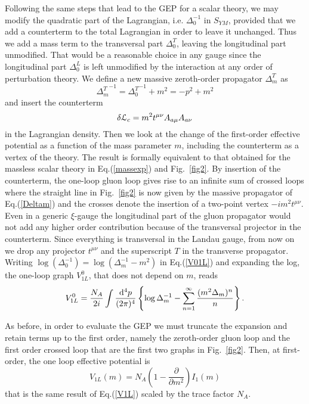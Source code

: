 \documentclass[aps,preprint]{revtex4}
\newcommand{\BE}{\begin{equation}}
\newcommand{\EE}{\end{equation}}
\newcommand{\ppp}{ \frac{{\rm d}^4p}{(2\pi)^4}}
\begin{document}
Following the same steps that lead to the GEP for a scalar theory, we may modify
the quadratic part of the Lagrangian, i.e. $\Delta_0^{-1}$ in $S_{YM}$, provided that we
add a counterterm to the total Lagrangian in order to leave it unchanged.
Thus we add a mass term to the transversal part $\Delta^T_0$, leaving the longitudinal 
part unmodified. That would be a reasonable choice in any gauge since the longitudinal
part $\Delta_0^L$ is left unmodified by the interaction at any order of perturbation theory.
We define a new massive zeroth-order propagator $\Delta_m^T$ as
\BE
{\Delta^T_m}^{-1}={\Delta^T_0}^{-1}+m^2=-p^2+m^2
\label{Deltam}
\EE
and insert the counterterm 
\BE
\delta {\cal L}_c= m^2 t^{\mu\nu} A_{a\mu} A_{a\nu}
\label{Lc}
\EE
in the Lagrangian density. Then we look at the change of the first-order effective potential
as a function of the mass parameter $m$, including the counterterm as a vertex of the theory.
The result is formally equivalent to that obtained for the massless scalar theory in Eq.(\ref{massexp})
and Fig.~\ref{fig2}. By insertion of the counterterm, the one-loop gluon loop gives rise to an infinite sum of
crossed loops where the straight line in Fig.~\ref{fig2} is now given by the massive propagator of Eq.(\ref{Deltam})
and the crosses denote the insertion of a two-point vertex $-i m^2 t^{\mu\nu}$. 
Even in a generic $\xi$-gauge the longitudinal part of the gluon propagator would not add any higher
order contribution because of the transversal projector in the counterterm. Since everything is transversal
in the Landau gauge, from now on we drop any projector $t^{\mu\nu}$ and the superscript $T$ in the 
transverse propagator. Writing $\log(\Delta_0^{-1})=\log (\Delta_m^{-1}-m^2)$ 
in Eq.(\ref{V01L}) and expanding the log,
the one-loop graph $V_{1L}^0$, that does not depend on $m$, reads
\BE
V^0_{1L}=\frac{N_A}{2 i}\int\ppp\left\{
\log \Delta_m^{-1} - \sum_{n=1}^{\infty}\frac{(m^2\Delta_m)^n}{n}\right\}.
\label{V01Lm}
\EE

As before, in order to evaluate the GEP we must truncate the expansion and retain terms up to
the first order, namely the zeroth-order gluon loop and the first order crossed loop that are the
first two graphs in Fig.~\ref{fig2}. Then, at first-order, the one loop effective potential is 
\BE
V_{1L} (m)=N_A\left( 1-\frac{\partial}{\partial m^2}\right) I_1(m)
\label{V1LA}
\EE
that is the same result of Eq.(\ref{V1L}) scaled by the trace factor $N_A$.
\end{document}
